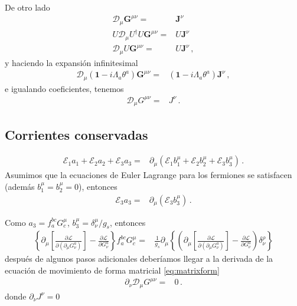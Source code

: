 De otro lado
\begin{align}
  \mathcal{D}_\mu{\boldsymbol{G}}^{\mu\nu}
=&\boldsymbol{J}^{\nu}\nonumber\\
U\mathcal{D}_\mu U^\dagger U {\boldsymbol{G}}^{\mu\nu}
=&U\boldsymbol{J}^{\nu}\nonumber\\
\mathcal{D}_\mu  U {\boldsymbol{G}}^{\mu\nu}
=&U\boldsymbol{J}^{\nu}\,,
\end{align}
y haciendo la expansión infinitesimal
\begin{align}
\mathcal{D}_\mu  (\boldsymbol{1}-i\Lambda_a \theta^a) {\boldsymbol{G}}^{\mu\nu}
=&(\boldsymbol{1}-i\Lambda_a \theta^a)\boldsymbol{J}^{\nu}\,,
\end{align}
e igualando coeficientes, tenemos
\begin{align}
\label{eq:matrixform}
  \mathcal{D}_\mu{{G}}^{\mu\nu}
=&{J}^{\nu}\,.
\end{align}
\subsection{Corrientes conservadas}


\begin{align}
  \mathcal{E}_1 a_1 + \mathcal{E}_2 a_2 + \mathcal{E}_3 a_3=& \partial_{\mu} \left( \mathcal{E}_1 b_1^{\mu} + \mathcal{E}_2 b_2^{\mu} + \mathcal{E}_3 b_3^{\mu}   \right) \,.
\end{align}
Asumimos que la ecuaciones de Euler Lagrange para los fermiones se satisfacen (además $b_1^{\mu}=b_2^{\mu}=0$), entonces
\begin{align}
   \mathcal{E}_3 a_3=& \partial_{\mu} \left(  \mathcal{E}_3 b_3^{\mu}   \right) \,.
\end{align}

Como $a_{3}=f_{a}^{bc} G^{\mu}_{c} $, $b_{3}^{\mu}=\delta^{\mu}_{\nu}/g_{s}$, entonces
\begin{align}
  \left\{ \partial_\mu\left[\frac{\partial\mathcal{L}}{\partial\left(\partial_\mu G_\nu^a\right)}\right]-\frac{\partial\mathcal{L}}{\partial G_\nu^a} \right\} f_{a}^{bc} G^{\mu}_{c} =&
\frac{1}{g_s}\partial_{\mu} \left\{\left(   \partial_\mu\left[\frac{\partial\mathcal{L}}{\partial\left(\partial_\mu G_\nu^a\right)}\right]-\frac{\partial\mathcal{L}}{\partial G_\nu^a} \right)\delta_{\nu}^{\rho}  \right\}
\end{align}
después de algunos pasos adicionales deberíamos llegar a la derivada de  la ecuación de movimiento de forma matricial
\eqref{eq:matrixform}
\begin{align}
\label{eq:matrixform}
  \partial_\nu\mathcal{D}_\mu{{G}}^{\mu\nu}
=&0\,.
\end{align}
donde $\partial_\nu{J}^{\nu}=0$

